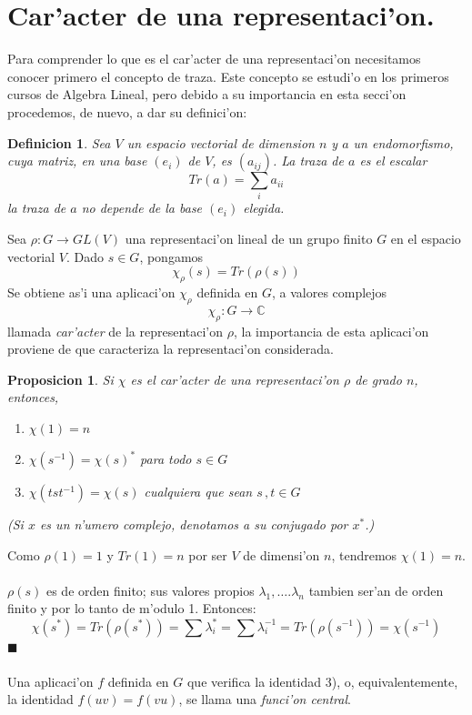 \documentclass[a4paper,openright,12pt]{book}
\numberwithin{equation}{section} %
\newtheorem{proposicion}{Proposicion}[section] %
\newtheorem{definicion}{Definicion}[section] %
\newenvironment{proof}{\noindent{\it Demostracion:}}{\hfill$\blacksquare$} %
\begin{document}
\section{Car'acter de una representaci'on.}
Para comprender lo que es el car'acter de una representaci'on necesitamos conocer primero el concepto de traza. Este concepto se estudi'o en los primeros cursos de Algebra Lineal, pero debido a su importancia en esta secci'on procedemos, de nuevo, a dar su definici'on:
\begin{definicion}
Sea $V$ un espacio vectorial de dimension $n$ y $a$ un endomorfismo, cuya matriz, en una base $(e_{i})$ de $V$, es $(a_{ij})$. La traza de $a$ es el escalar 
\[
Tr(a)=\sum_{i} a_{ii}
\]
la traza de $a$ no depende de la base $(e_{i})$ elegida.
\end{definicion}
Sea $\rho : G \rightarrow GL(V)$ una representaci'on lineal de un grupo finito $G$ en el espacio vectorial $V$. Dado $s \in G$, pongamos 
\[
\chi_{\rho}(s)=Tr(\rho(s))
\]
Se obtiene as'i una aplicaci'on $\chi_{\rho}$ definida en $G$, a valores complejos
\[
\chi_{\rho} : G \rightarrow \mathbb{C} 
\]    
llamada \emph{car'acter} de la representaci'on $\rho$, la importancia de esta aplicaci'on proviene de que caracteriza la representaci'on considerada.
\begin{proposicion}
Si $\chi$ es el car'acter de una representaci'on $\rho$ de grado $n$, entonces,
\begin{enumerate}
\item $\chi (1)=n$
\item $\chi (s^{-1})=\chi (s)^{*}$ para todo $s \in G$
\item $\chi (tst^{-1})=\chi(s)$ cualquiera que sean $s \, ,t \in G $
\end{enumerate} 
(Si $x$ es un n'umero complejo, denotamos a su conjugado por $x^{*}$.)
\end{proposicion} 
\begin{proof}
Como $\rho (1) = 1$ y $Tr(1)=n$ por ser $V$ de dimensi'on $n$, tendremos $\chi (1)=n$.\\
\\
$\rho (s)$ es de orden finito; sus valores propios $\lambda_{1}, \ldots .\lambda_{n}$ tambien ser'an de orden finito y por lo tanto de m'odulo 1. Entonces:
\[
\chi (s^{*})=Tr(\rho (s^{*}))=\sum \lambda_{i}^{*}= \sum \lambda_{i}^{-1}=Tr(\rho (s^{-1}))=\chi (s^{-1})
\]
\end{proof}\\
\\
Una aplicaci'on $f$ definida en $G$ que verifica la identidad 3), o, equivalentemente, la identidad $f(uv)=f(vu)$, se llama una \emph{funci'on central}. 
\end{document}
